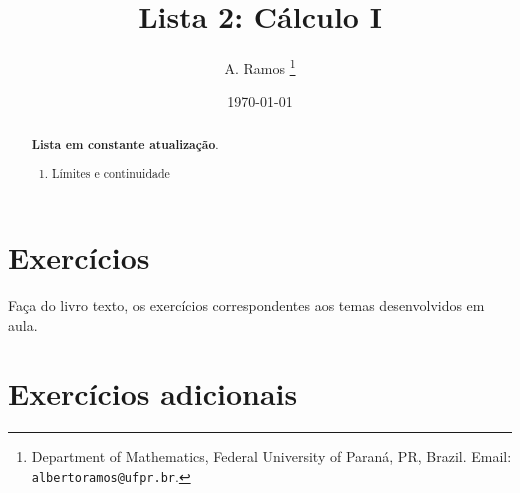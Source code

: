 \documentclass[latin,20pt]{article}
\begin{document}
\title{Lista 2: Cálculo I }
 
\author{
A. Ramos \thanks{Department of Mathematics,
    Federal University of Paraná, PR, Brazil.
    Email: {\tt albertoramos@ufpr.br}.}
}

\date{\today}
 
\maketitle

\begin{abstract}
{\bf Lista em constante atualização}.
 \begin{enumerate}
 \item Límites e continuidade 
 \end{enumerate}
\end{abstract}

 
  \section{Exercícios}   
 
 Faça do livro texto, os exercícios correspondentes aos temas desenvolvidos em aula. 
  
  \section{Exercícios adicionais}  
\end{document}

